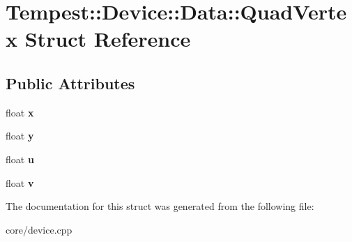 \hypertarget{struct_device_1_1_data_1_1_quad_vertex}{\section{Tempest\+:\+:Device\+:\+:Data\+:\+:Quad\+Vertex Struct Reference}
\label{struct_device_1_1_data_1_1_quad_vertex}
}
\subsection*{Public Attributes}
\begin{DoxyCompactItemize}
\item 
\hypertarget{struct_device_1_1_data_1_1_quad_vertex_ae6fa676e844604da9ebb7cd49294d8e7}{float {\bfseries x}}\label{struct_device_1_1_data_1_1_quad_vertex_ae6fa676e844604da9ebb7cd49294d8e7}

\item 
\hypertarget{struct_device_1_1_data_1_1_quad_vertex_a55b0d0e59634bfd84009197df2a98898}{float {\bfseries y}}\label{struct_device_1_1_data_1_1_quad_vertex_a55b0d0e59634bfd84009197df2a98898}

\item 
\hypertarget{struct_device_1_1_data_1_1_quad_vertex_a815814eb611c2e617e8b1e65971b362d}{float {\bfseries u}}\label{struct_device_1_1_data_1_1_quad_vertex_a815814eb611c2e617e8b1e65971b362d}

\item 
\hypertarget{struct_device_1_1_data_1_1_quad_vertex_a1009f26cdfa622ae0c4801dac2933c15}{float {\bfseries v}}\label{struct_device_1_1_data_1_1_quad_vertex_a1009f26cdfa622ae0c4801dac2933c15}

\end{DoxyCompactItemize}


The documentation for this struct was generated from the following file\+:\begin{DoxyCompactItemize}
\item 
core/device.\+cpp\end{DoxyCompactItemize}
